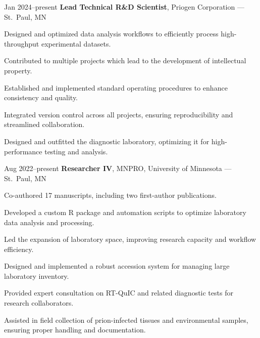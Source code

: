 \documentclass{resume}
\begin{document}
        \begin{twocolentry}{Jan 2024--present}
            \textbf{Lead Technical R\&D Scientist}, Priogen Corporation --- St.\ Paul, MN
        \end{twocolentry}
        \begin{onecolentry}
            \begin{highlights}
                \item Designed and optimized data analysis workflows to efficiently process high-throughput experimental datasets.
                \item Contributed to multiple projects which lead to the development of intellectual property.
                \item Established and implemented standard operating procedures to enhance consistency and quality.
                \item Integrated version control across all projects, ensuring reproducibility and streamlined collaboration.
                \item Designed and outfitted the diagnostic laboratory, optimizing it for high-performance testing and analysis.
            \end{highlights}
        \end{onecolentry}

        \begin{twocolentry}{Aug 2022--present}
            \textbf{Researcher IV}, MNPRO, University of Minnesota --- St.\ Paul, MN
        \end{twocolentry}
        \begin{onecolentry}
            \begin{highlights}
                \item Co-authored 17 manuscripts, including two first-author publications.
                \item Developed a custom R package and automation scripts to optimize laboratory data analysis and processing.
                \item Led the expansion of laboratory space, improving research capacity and workflow efficiency.
                \item Designed and implemented a robust accession system for managing large laboratory inventory.
                \item Provided expert consultation on RT-QuIC and related diagnostic tests for research collaborators.
                \item Assisted in field collection of prion-infected tissues and environmental samples, ensuring proper handling and documentation.
            \end{highlights}
        \end{onecolentry}
\end{document}
